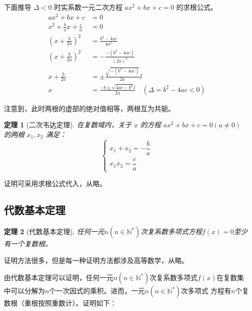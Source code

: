 \documentclass[a4paper,openany]{ctexbook}
\newtheorem{thmlevel1}{定理}[chapter]
\begin{document}
下面推导 \(\varDelta<0\) 时实系数一元二次方程 \(ax^2+bx+c=0\) 的求根公式。
\begin{align*}
    ax^2+bx+c                     & =0                                                             \\
    x^2+\frac{b}{a}x+\frac{c}{a}  & =0                                                             \\
    \left(x+\frac{b}{2a}\right)^2 & =\frac{b^2-4ac}{4a^2}                                          \\
    \left(x+\frac{b}{2a}\right)^2 & =-\frac{-(b^2-4ac)}{(2a)^2}                                    \\
    x+\frac{b}{2a}                & =\pm\frac{\sqrt{-(b^2-4ac)}}{2a}\ii                            \\
    x                             & =\frac{-b\pm\sqrt{4ac-b^2}\ii}{2a} \quad (\varDelta=b^2-4ac<0)
\end{align*}

注意到，此时两根的虚部的绝对值相等，两根互为共轭。

\begin{thmlevel1}[二次韦达定理]\label{thm:erciwwdadkli}
    在复数域内，关于 \(x\) 的方程 \(ax^2+bx+c=0(a\ne 0)\) 的两根 \(x_1,x_2\) 满足：
    \[
        \begin{cases}
            x_1+x_2=-\dfrac{b}{a} \\
            x_1x_2=\dfrac{c}{a}
        \end{cases}
    \]
\end{thmlevel1}

证明可采用求根公式代入，从略。

\subsection{代数基本定理}

\begin{thmlevel1}[代数基本定理]
    任何一元\(n(n\in \mathbb{N^*})\)次复系数多项式方程\(f(x)=0\)至少有一个复数根。
\end{thmlevel1}

证明方法很多，但是每一种证明方法都涉及高等数学，从略。

由代数基本定理可以证明，任何一元\(n(n\in \mathbb{N^*})\)次复系数多项式\(f(x)\)在复数集中可以分解为\(n\)个一次因式的乘积。进而，一元\(n(n\in \mathbb{N^*})\)次多项式
方程有\(n\)个复数根（重根按照重数计）。证明如下：
\end{document}
